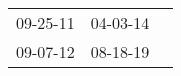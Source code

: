 \begin{supertabular}{lll}
 09-25-11\textsuperscript{} &  04-03-14\textsuperscript{} \\
 09-07-12\textsuperscript{} &  08-18-19\textsuperscript{} \\
\end{supertabular}
